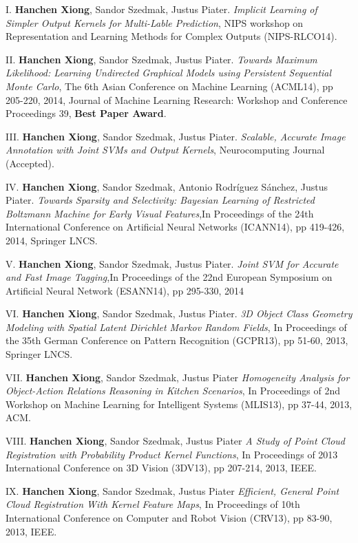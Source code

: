 \begin{shaded}
{\Huge I.} \textbf{Hanchen Xiong}, Sandor Szedmak, Justus Piater. {\it Implicit Learning of Simpler Output Kernels for Multi-Lable Prediction}, NIPS workshop on Representation and Learning Methods for Complex Outputs (NIPS-RLCO14).  
\vspace{-.2cm}

{\Huge II.} \textbf{Hanchen Xiong}, Sandor Szedmak, Justus Piater. {\it Towards Maximum Likelihood: Learning Undirected Graphical Models using Persistent Sequential Monte Carlo}, The 6th Asian Conference on Machine Learning (ACML14), pp 205-220, 2014, Journal of Machine Learning Research: Workshop and Conference Proceedings 39, 
\textbf{Best Paper Award}.    
\vspace{-.2cm}

{\Huge III.} \textbf{Hanchen Xiong}, Sandor Szedmak, Justus Piater. {\it Scalable, Accurate Image Annotation with Joint SVMs and Output Kernels}, Neurocomputing Journal (Accepted).  
\vspace{-.2cm}

{\Huge IV.} \textbf{Hanchen Xiong}, Sandor Szedmak, Antonio Rodr{\'i}guez S{\'a}nchez, Justus Piater. {\it Towards Sparsity and Selectivity: Bayesian Learning of Restricted Boltzmann Machine for Early Visual Features},In Proceedings of the 24th International Conference on Artificial Neural Networks (ICANN14), pp 419-426, 2014, Springer LNCS. 
\vspace{-.2cm}

{\Huge V.} \textbf{Hanchen Xiong}, Sandor Szedmak, Justus Piater. {\it Joint SVM for Accurate and Fast Image Tagging},In Proceedings of the 22nd European Symposium on Artificial Neural Network (ESANN14), 
pp 295-330, 2014
\vspace{-.2cm}


{\Huge VI.} \textbf{Hanchen Xiong}, Sandor Szedmak, Justus Piater. {\it 3D Object Class Geometry Modeling with Spatial Latent Dirichlet Markov Random Fields}, In Proceedings of the 35th German Conference on Pattern Recognition (GCPR13), pp 51-60, 2013,  Springer LNCS.  
\vspace{-.2cm}

{\Huge VII.} \textbf{Hanchen Xiong}, Sandor Szedmak, Justus Piater {\it Homogeneity Analysis for Object-Action Relations Reasoning in Kitchen Scenarios}, 
In Proceedings of 2nd Workshop on Machine Learning for Intelligent Systems (MLIS13), pp 37-44,  2013, ACM. 
\vspace{-.2cm}

  {\Huge VIII.} \textbf{Hanchen Xiong}, Sandor Szedmak, Justus Piater {\it A Study of Point Cloud Registration with Probability Product Kernel Functions}, 
In Proceedings of 2013 International Conference on 3D Vision (3DV13), pp 207-214,  2013, IEEE.
\vspace{-.2cm}

 {\Huge IX.} \textbf{Hanchen Xiong}, Sandor Szedmak, Justus Piater {\it Efficient, General Point Cloud Registration With Kernel Feature Maps}, 
In Proceedings of 10th International Conference on Computer and Robot Vision (CRV13), pp 83-90, 2013, IEEE.

\vspace{-.2cm}
\end{shaded}

